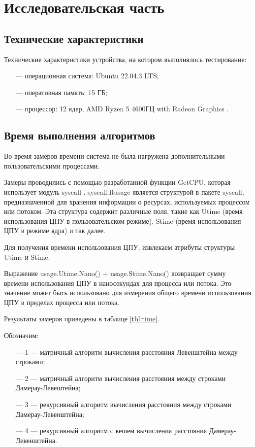 \chapter{Исследовательская часть}

\section{Технические характеристики}

Технические характеристики устройства, на котором выполнялось тестирование:

\begin{itemize}
	\item[---] операционная система: Ubuntu \cite{ubuntu} 22.04.3 LTS;
	\item[---] оперативная память: 15 ГБ;
	\item[---] процессор: 12 ядер, AMD Ryzen 5 4600ГЦ with Radeon Graphics \cite{amd}.
\end{itemize}


\section{Время выполнения алгоритмов}

Во время замеров времени система не была нагружена дополнительными пользовательскими процессами.

Замеры проводились с помощью разработанной функции GetCPU, которая использует модуль syscall \cite{syscall}. syscall.Rusage является структурой в пакете syscall, предназначенной для хранения информации о ресурсах, используемых процессом или потоком. Эта структура содержит различные поля, такие как Utime (время использования ЦПУ в пользовательском режиме), Stime (время использования ЦПУ в режиме ядра) и так далее.

Для получения времени использования ЦПУ, извлекаем атрибуты структуры Utime и Stime.

Выражение usage.Utime.Nano() + usage.Stime.Nano() возвращает сумму времени использования ЦПУ в наносекундах для процесса или потока. Это значение может быть использовано для измерения общего времени использования ЦПУ в пределах процесса или потока.

Результаты замеров приведены в таблице \ref{tbl:time}.

Обозначим: 
\begin{itemize}
	\item[---] 1 --- матричный алгоритм вычисления расстояния Левенштейна между строками;
	\item[---] 2 --- матричный алгоритм вычисления расстояния между строками Дамерау-Левештейна;
	\item[---] 3 --- рекурсивный алгоритм вычисления расстояния между строками Дамерау-Левенштейна;
	\item[---] 4 --- рекурсивный алгоритм с кешем вычисления расстояния Дамерау-Левенштейна.
\end{itemize}



